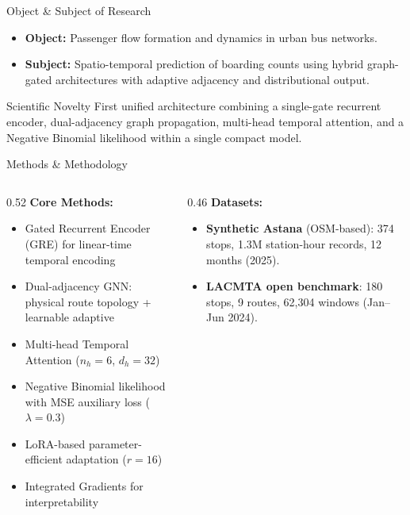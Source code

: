 \documentclass[aspectratio=169, 11pt]{beamer}
\begin{document}
\begin{frame}{Object \& Subject of Research}
\vspace{0.3em}
\begin{itemize}
  \item \textbf{Object:} Passenger flow formation and dynamics in urban bus networks.
  \vspace{0.5em}
  \item \textbf{Subject:} Spatio-temporal prediction of boarding counts using hybrid graph-gated architectures with \textcolor{accent}{adaptive adjacency} and \textcolor{accent}{distributional output}.
\end{itemize}

\vspace{0.6em}
\begin{block}{Scientific Novelty}
First unified architecture combining a single-gate recurrent encoder, dual-adjacency graph propagation, multi-head temporal attention, and a Negative Binomial likelihood within a single compact model.
\end{block}
\end{frame}

\begin{frame}{Methods \& Methodology}
\vspace{0.2em}
\begin{columns}[T]
\begin{column}{0.52\textwidth}
\textbf{Core Methods:}
\begin{itemize}
  \item Gated Recurrent Encoder (GRE) for linear-time temporal encoding
  \item Dual-adjacency GNN: physical route topology + learnable adaptive
  \item Multi-head Temporal Attention ($n_h=6$, $d_h=32$)
  \item Negative Binomial likelihood with MSE auxiliary loss ($\lambda=0.3$)
  \item LoRA-based parameter-efficient adaptation ($r=16$)
  \item Integrated Gradients for interpretability
\end{itemize}
\end{column}
\begin{column}{0.46\textwidth}
\textbf{Datasets:}
\begin{itemize}
  \item \textbf{Synthetic Astana} (OSM-based): 374 stops, 1.3M station-hour records, 12 months (2025).
  \item \textbf{LACMTA open benchmark}: 180 stops, 9 routes, 62,304 windows (Jan--Jun 2024).
\end{itemize}
\end{column}
\end{columns}
\end{frame}
\end{document}
